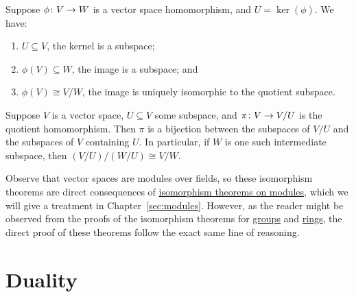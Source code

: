 \begin{theorem}\label{thm:iso-1-vsp}
    Suppose \(\phi\colon V\to W\) is a vector space homomorphism,
    and \(U = \ker(\phi)\).
    We have:
    \begin{enumerate}[label={(\alph*)}, itemsep=0mm]
        \item \(U \subseteq V\), the kernel is a subspace;
        \item \(\phi(V) \subseteq W\), the image is a subspace; and
        \item \(\phi(V) \cong V/W\), the image is uniquely isomorphic to the quotient subspace.
    \end{enumerate}
\end{theorem}
\begin{theorem}\label{thm:iso-3-vsp}\label{thm:iso-4-vsp}
    Suppose \(V\) is a vector space, \(U \subseteq V\) some subspace,
    and \(\pi\colon V\to V/U\) is the quotient homomorphism.
    Then \(\pi\) is a bijection between the subspaces of \(V/U\)
    and the subspaces of \(V\) containing \(U\).
    In particular, if \(W\) is one such intermediate subspace,
    then \((V/U)/(W/U) \cong V/W\).
\end{theorem}
\begin{remark}
    Observe that vector spaces are modules over fields,
    so these isomorphism theorems are direct consequences of
    \hyperref[thm:iso-1-module]{isomorphism theorems on modules},
    which we will give a treatment in Chapter~\ref{sec:modules}.
    However, as the reader might be observed
    from the proofs of the isomorphism theorems
    for \hyperref[thm:iso-1-group]{groups} and \hyperref[thm:iso-1-ring]{rings},
    the direct proof of these theorems follow the exact same line of reasoning.
\end{remark}


\section{Duality}

